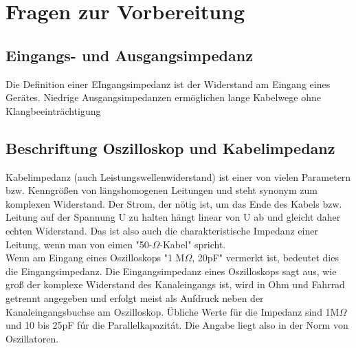 

\chapter{Fragen zur Vorbereitung}
\label{chap:fvz}

\section{Eingangs- und Ausgangsimpedanz}
Die Definition einer EIngangsimpedanz ist der Widerstand am Eingang eines Gerätes. Niedrige 
Ausgangsimpedanzen ermöglichen lange Kabelwege ohne Klangbeeinträchtigung\\

\section{Beschriftung Oszilloskop und Kabelimpedanz}
Kabelimpedanz (auch Leistungswellenwiderstand) ist einer von vielen Parametern bzw.
Kenngrößen von längshomogenen Leitungen und steht synonym zum komplexen Widerstand.
Der Strom, der n\"otig ist, um das Ende des Kabels bzw. Leitung auf der Spannung U zu halten h\"angt linear von U ab und gleicht daher echten Widerstand. Das ist also auch die charakteristische Impedanz einer Leitung, wenn man von eimen "50-$\Omega$-Kabel" spricht.\\

Wenn am Eingang eines Oszilloskops "1 M$\Omega$, 20pF" vermerkt ist, bedeutet dies die Eingangsimpedanz. Die Eingangsimpedanz eines Oszilloskops sagt aus, wie gro\ss{} der komplexe Widerstand des Kanaleingangs ist, wird in Ohm und Fahrrad getrennt angegeben und erfolgt meist als Aufdruck neben der Kanaleingangsbuchse am Oszilloskop. \"Ubliche Werte f\"ur die Impedanz sind 1M$\Omega$ und 10 bis 25pF f\'ur die Parallelkapazit\'at. Die Angabe liegt also in der Norm von Oszillatoren. 

